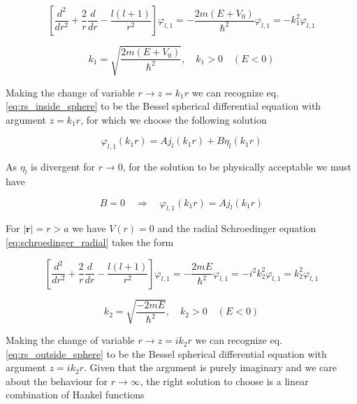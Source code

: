 \documentclass{article}
\begin{document}
\begin{equation}
\label{eq:rs_inside_sphere}
\left[ \frac{d^2}{dr^2} + \frac{2}{r} \frac{d}{dr} - \frac{l \left(l+1 \right)}{r^2} \right] \varphi_{l,1} = - \frac{2m(E+V_0)}{\hbar^2} \varphi_{l,1} = -k_1^2 \varphi_{l,1}
\end{equation}

\begin{equation}
k_1 = \sqrt{\frac{2m(E+V_0)}{\hbar^2}}, \quad k_1 > 0 \quad (E<0)
\end{equation}

Making the change of variable \( r \rightarrow z = k_1r \) we can recognize eq. \eqref{eq:rs_inside_sphere} to be the Bessel spherical differential equation with argument \(z = k_1 r\), for which we choose the following solution

\begin{equation}
\varphi_{l,1}(k_1r) = A j_l(k_1r) + B \eta_l(k_1r)
\end{equation}

As \( \eta_l \) is divergent for \( r \rightarrow 0 \), for the solution to be physically acceptable we must have

\begin{equation}
B = 0 \quad \Rightarrow \quad \varphi_{l,1}(k_1r) = A j_l(k_1r)
\end{equation}

For \( \left| \bm{r} \right| = r > a \) we have \( V(r) = 0 \) and the radial Schroedinger equation \eqref{eq:schroedinger_radial} takes the form

\begin{equation}
\label{eq:rs_outside_sphere}
\left[ \frac{d^2}{dr^2} + \frac{2}{r} \frac{d}{dr} - \frac{l \left(l+1 \right)}{r^2} \right] \varphi_{l,1} = - \frac{2mE}{\hbar^2} \varphi_{l,1} = - i^2 k_2^2 \varphi_{l,1} = k_2^2 \varphi_{l,1}
\end{equation}

\begin{equation}
k_2 = \sqrt{\frac{-2mE}{\hbar^2}}, \quad k_2 > 0 \quad (E<0)
\end{equation}

Making the change of variable \( r \rightarrow z = i k_2 r \) we can recognize eq. \eqref{eq:rs_outside_sphere} to be the Bessel spherical differential equation with argument \(z = i k_2 r\). Given that the argument is purely imaginary and we care about the behaviour for \( r \rightarrow \infty \), the right solution to choose is a linear combination of Hankel functions
\end{document}
